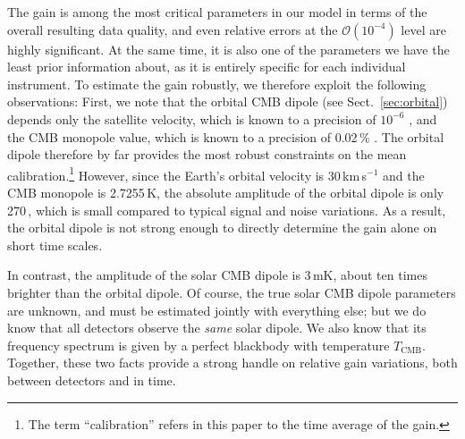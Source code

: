 \documentclass[onecolumn]{aa}
\begin{document}
The gain is among the most critical parameters in our model in terms
of the overall resulting data quality, and even relative errors at the
$\mathcal{O}(10^{-4})$ level are highly significant. At the same time,
it is also one of the parameters we have the least prior information
about, as it is entirely specific for each individual instrument. To
estimate the gain robustly, we therefore exploit the following
observations: First, we note that the orbital CMB dipole (see
Sect.~\ref{sec:orbital}) depends only the satellite velocity, which is
known to a precision of $10^{-6}$ \citep{godard2009}, and
the CMB monopole value, which is known to a precision of 0.02\,\%
\citep{fixsen2009}. The orbital dipole therefore by far provides the
most robust constraints on the mean calibration.\footnote{The term
  ``calibration'' refers in this paper to the time average of the
  gain.} However, since the Earth's orbital velocity is
30\,km\,s$^{-1}$ and the CMB monopole is 2.7255\,K, the absolute
amplitude of the orbital dipole is only 270\,\muK, which is small
compared to typical signal and noise variations. As a result, the
orbital dipole is not strong enough to directly determine the gain
alone on short time scales.

In contrast, the amplitude of the solar CMB dipole is 3\,mK, about ten
times brighter than the orbital dipole. Of course, the true solar CMB
dipole parameters are unknown, and must be estimated jointly with
everything else; but we do know that all detectors observe the
\emph{same} solar dipole. We also know that its frequency spectrum is
given by a perfect blackbody with temperature $T_{\mathrm{CMB}}$. Together, these
two facts provide a strong handle on relative gain variations, both
between detectors and in time.
\end{document}
